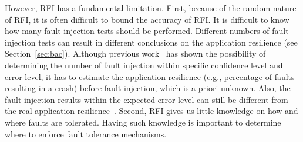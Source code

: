 \begin{comment}
However, FI has a fundamental limitation. 
First, because of the random nature of FI, it is often difficult to
bound the accuracy of FI. %
There is no quantitative guidance on how many fault injection tests should be performed.
Different number of fault injection tests can result in different conclusions about the application resilience (see Section~\ref{sec:bac}).
Second, FI tests are not deterministically repeatable,
because where and when to inject a fault are completely random.
However, having determinability on FI tests
is important for reproducing faults in the fault tolerance implementation
or prune unnecessary FI tests.
\end{comment}
However, RFI has a fundamental limitation. 
First, because of the random nature of RFI, it is often difficult to
bound the accuracy of RFI. %
It is difficult to know how many fault injection tests should be performed.
Different numbers of fault injection tests can result in different conclusions on the application resilience (see Section~\ref{sec:bac}).
Although previous work~\cite{date09:leveugle} has shown the possibility of determining the number of fault injection within specific confidence level and error level, it has to estimate the application resilience (e.g., percentage of faults resulting in a crash) before fault injection, which is a priori unknown. 
Also, the fault injection results within the expected error level can still be 
different from the real application resilience~\cite{date09:leveugle}.
Second, RFI gives us little knowledge on how and where faults are tolerated. 
Having such knowledge is important to determine where to enforce fault tolerance mechanisms.

